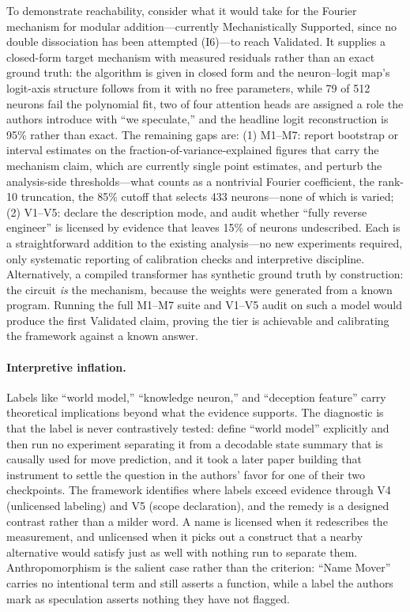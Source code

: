 \documentclass{article}
\begin{document}
To demonstrate reachability, consider what it would take for the Fourier mechanism for modular addition---currently Mechanistically Supported, since no double dissociation has been attempted (I6)---to reach Validated. It supplies a closed-form target mechanism with measured residuals rather than an exact ground truth: the algorithm is given in closed form and the neuron--logit map's logit-axis structure follows from it with no free parameters, while 79 of 512 neurons fail the polynomial fit, two of four attention heads are assigned a role the authors introduce with ``we speculate,'' and the headline logit reconstruction is 95\% rather than exact. The remaining gaps are: (1) M1--M7: report bootstrap or interval estimates on the fraction-of-variance-explained figures that carry the mechanism claim, which are currently single point estimates, and perturb the analysis-side thresholds---what counts as a nontrivial Fourier coefficient, the rank-10 truncation, the 85\% cutoff that selects 433 neurons---none of which is varied; (2) V1--V5: declare the description mode, and audit whether ``fully reverse engineer'' is licensed by evidence that leaves 15\% of neurons undescribed. Each is a straightforward addition to the existing analysis---no new experiments required, only systematic reporting of calibration checks and interpretive discipline. Alternatively, a compiled transformer \citep{lindner2023interp} has synthetic ground truth by construction: the circuit \emph{is} the mechanism, because the weights were generated from a known program. Running the full M1--M7 suite and V1--V5 audit on such a model would produce the first Validated claim, proving the tier is achievable and calibrating the framework against a known answer.

\paragraph{Interpretive inflation.} Labels like ``world model,'' ``knowledge neuron,'' and ``deception feature'' carry theoretical implications beyond what the evidence supports. The diagnostic is that the label is never contrastively tested: \citet{li2023othello} define ``world model'' explicitly and then run no experiment separating it from a decodable state summary that is causally used for move prediction, and it took a later paper building that instrument to settle the question in the authors' favor for one of their two checkpoints. The framework identifies where labels exceed evidence through V4 (unlicensed labeling) and V5 (scope declaration), and the remedy is a designed contrast rather than a milder word. A name is licensed when it redescribes the measurement, and unlicensed when it picks out a construct that a nearby alternative would satisfy just as well with nothing run to separate them. Anthropomorphism is the salient case rather than the criterion: ``Name Mover'' carries no intentional term and still asserts a function, while a label the authors mark as speculation asserts nothing they have not flagged.
\end{document}
